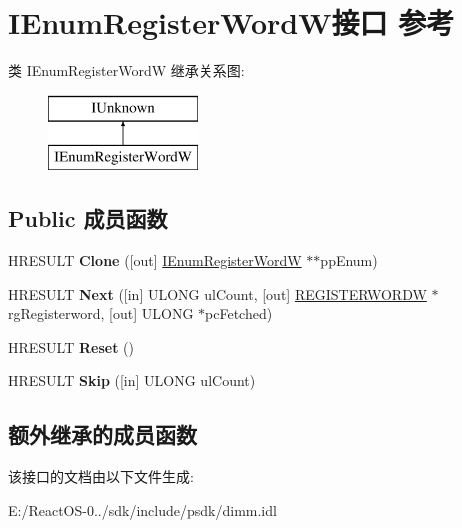 \hypertarget{interface_i_enum_register_word_w}{}\section{I\+Enum\+Register\+Word\+W接口 参考}
\label{interface_i_enum_register_word_w}
类 I\+Enum\+Register\+WordW 继承关系图\+:\begin{figure}[H]
\begin{center}
\leavevmode
\includegraphics[height=2.000000cm]{interface_i_enum_register_word_w}
\end{center}
\end{figure}
\subsection*{Public 成员函数}
\begin{DoxyCompactItemize}
\item 
\mbox{\label{interface_i_enum_register_word_w_a1439d42752199a880ed6d5988b9237d9}} 
H\+R\+E\+S\+U\+LT {\bfseries Clone} (\mbox{[}out\mbox{]} \hyperlink{interface_i_enum_register_word_w}{I\+Enum\+Register\+WordW} $\ast$$\ast$pp\+Enum)
\item 
\mbox{\label{interface_i_enum_register_word_w_a3c9308e4122c8661ea8320d371a248be}} 
H\+R\+E\+S\+U\+LT {\bfseries Next} (\mbox{[}in\mbox{]} U\+L\+O\+NG ul\+Count, \mbox{[}out\mbox{]} \hyperlink{struct_r_e_g_i_s_t_e_r_w_o_r_d_w}{R\+E\+G\+I\+S\+T\+E\+R\+W\+O\+R\+DW} $\ast$rg\+Registerword, \mbox{[}out\mbox{]} U\+L\+O\+NG $\ast$pc\+Fetched)
\item 
\mbox{\label{interface_i_enum_register_word_w_a9beea833462575adc812d2ea61fb32c4}} 
H\+R\+E\+S\+U\+LT {\bfseries Reset} ()
\item 
\mbox{\label{interface_i_enum_register_word_w_a1482dd340c6a51c98cb3f3506931c154}} 
H\+R\+E\+S\+U\+LT {\bfseries Skip} (\mbox{[}in\mbox{]} U\+L\+O\+NG ul\+Count)
\end{DoxyCompactItemize}
\subsection*{额外继承的成员函数}


该接口的文档由以下文件生成\+:\begin{DoxyCompactItemize}
\item 
E\+:/\+React\+O\+S-\/0../sdk/include/psdk/dimm.\+idl\end{DoxyCompactItemize}

